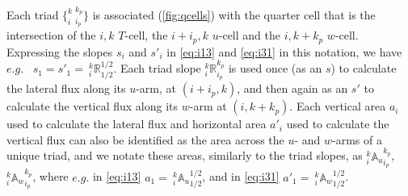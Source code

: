 \documentclass[../tex_main/NEMO_manual]{subfiles}
\begin{document}
Each triad $\{_i^{k}\:_{i_p}^{k_p}\}$ is associated (\autoref{fig:qcells}) with the quarter
cell that is the intersection of the $i,k$ $T$-cell, the $i+i_p,k$ $u$-cell and the $i,k+k_p$ $w$-cell. 
Expressing the slopes $s_i$ and $s'_i$ in \autoref{eq:i13} and \autoref{eq:i31} in this notation, 
we have $e.g.$ \ $s_1=s'_1={\:}_i^k \mathbb{R}_{1/2}^{1/2}$. 
Each triad slope $_i^k\mathbb{R}_{i_p}^{k_p}$ is used once (as an $s$) 
to calculate the lateral flux along its $u$-arm, at $(i+i_p,k)$, 
and then again as an $s'$ to calculate the vertical flux along its $w$-arm at $(i,k+k_p)$. 
Each vertical area $a_i$ used to calculate the lateral flux and horizontal area $a'_i$ used 
to calculate the vertical flux can also be identified as the area across the $u$- and $w$-arms 
of a unique triad, and we notate these areas, similarly to the triad slopes, 
as $_i^k{\mathbb{A}_u}_{i_p}^{k_p}$, $_i^k{\mathbb{A}_w}_{i_p}^{k_p}$, 
where $e.g.$ in \autoref{eq:i13} $a_{1}={\:}_i^k{\mathbb{A}_u}_{1/2}^{1/2}$, 
and in \autoref{eq:i31} $a'_{1}={\:}_i^k{\mathbb{A}_w}_{1/2}^{1/2}$.
\end{document}
